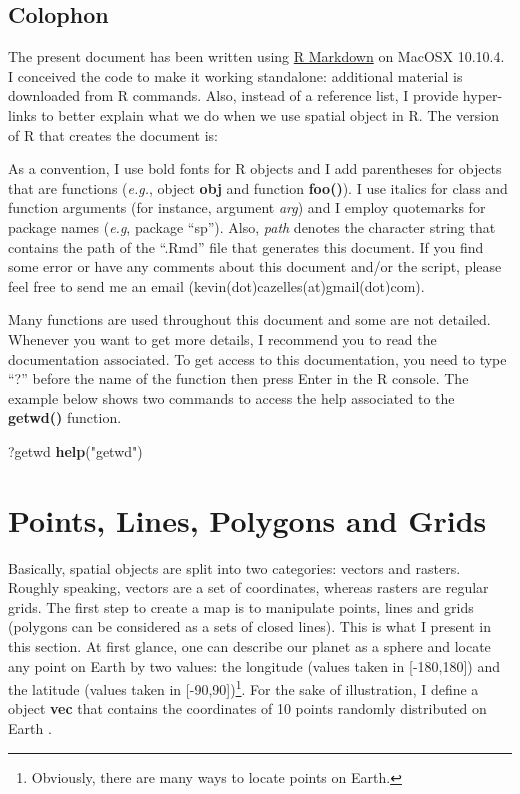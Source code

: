 \documentclass[]{report}
\newenvironment{Shaded}{\begin{snugshade}}{\end{snugshade}}
\newcommand{\KeywordTok}[1]{\textcolor[rgb]{0.13,0.29,0.53}{\textbf{{#1}}}}
\newcommand{\StringTok}[1]{\textcolor[rgb]{0.31,0.60,0.02}{{#1}}}
\newcommand{\NormalTok}[1]{{#1}}
\let\rmarkdownfootnote\footnote%
\def\footnote{\protect\rmarkdownfootnote}
\begin{document}
\section{Colophon}\label{colophon}

The present document has been written using
\href{http://rmarkdown.rstudio.com/authoring_rcodechunks.html}{R
Markdown} on MacOSX 10.10.4. I conceived the code to make it working
standalone: additional material is downloaded from R commands. Also,
instead of a reference list, I provide hyper-links to better explain
what we do when we use spatial object in R. The version of R that
creates the document is:

As a convention, I use bold fonts for R objects and I add parentheses
for objects that are functions (\emph{e.g.}, object \textbf{obj} and
function \textbf{foo()}). I use italics for class and function arguments
(for instance, argument \emph{arg}) and I employ quotemarks for package
names (\emph{e.g}, package ``sp''). Also, \emph{path} denotes the
character string that contains the path of the ``.Rmd'' file that
generates this document. If you find some error or have any comments
about this document and/or the script, please feel free to send me an
email (kevin(dot)cazelles(at)gmail(dot)com).

Many functions are used throughout this document and some are not
detailed. Whenever you want to get more details, I recommend you to read
the documentation associated. To get access to this documentation, you
need to type ``?'' before the name of the function then press Enter in
the R console. The example below shows two commands to access the help
associated to the \textbf{getwd()} function.

\begin{Shaded}
\begin{Highlighting}[]
\NormalTok{?getwd}
\KeywordTok{help}\NormalTok{(}\StringTok{"getwd"}\NormalTok{)}
\end{Highlighting}
\end{Shaded}

\chapter{Points, Lines, Polygons and
Grids}\label{points-lines-polygons-and-grids}

Basically, spatial objects are split into two categories: vectors and
rasters. Roughly speaking, vectors are a set of coordinates, whereas
rasters are regular grids. The first step to create a map is to
manipulate points, lines and grids (polygons can be considered as a sets
of closed lines). This is what I present in this section. At first
glance, one can describe our planet as a sphere and locate any point on
Earth by two values: the longitude (values taken in {[}-180,180{]}) and
the latitude (values taken in {[}-90,90{]})\footnote{Obviously, there
  are many ways to locate points on Earth.}. For the sake of
illustration, I define a object \textbf{vec} that contains the
coordinates of 10 points randomly distributed on Earth .
\end{document}
